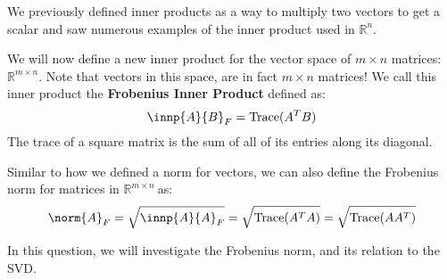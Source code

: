 

We previously defined inner products as a way to multiply two vectors to get a scalar and saw numerous examples of the inner product used in $\mathbb{R}^{n}.$

We will now define a new inner product for the vector space of $m \times n$ matrices: $\mathbb{R}^{m \times n}.$
Note that vectors in this space, are in fact $m \times n$ matrices!
We call this inner product the \textbf{Frobenius Inner Product} defined as:
\begin{equation}
  \innp{A}{B}_{F} = \text{Trace}(A^{T} B)
\end{equation}
The trace of a square matrix is the sum of all of its entries along its diagonal.

Similar to how we defined a norm for vectors, we can also define the Frobenius norm for matrices in $\mathbb{R}^{m \times n}\ $as:
\begin{equation}
  \norm{A}_{F} = \sqrt{\innp{A}{A}_{F}} = \sqrt{\text{Trace}(A^{T} A)} = \sqrt{\text{Trace}(A A^{T})}
\end{equation}

In this question, we will investigate the Frobenius norm, and its relation to the SVD.

